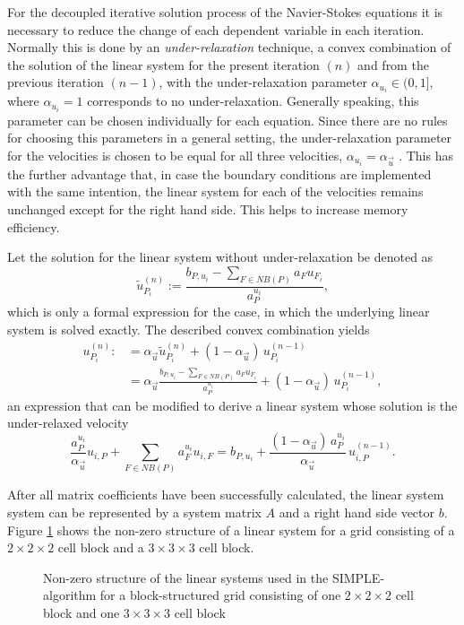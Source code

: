 For the decoupled iterative solution process of the Navier-Stokes equations it is necessary to reduce the change of each dependent variable in each iteration. Normally this is done by an \emph{under-relaxation} technique, a convex combination of the solution of the linear system for the present iteration \((n)\) and from the previous iteration \((n-1)\), with the under-relaxation parameter \(\alpha_{u_i} \in (0,1]\), where \(\alpha_{u_i} = 1\) corresponds to no under-relaxation. Generally speaking, this parameter can be chosen individually for each equation. Since there are no rules for choosing this parameters in a general setting, the under-relaxation parameter for the velocities is chosen to be equal for all three velocities, \(\alpha_{u_i} = \alpha_{\vec{u}}\) \cite{schaefer99}. This has the further advantage that, in case the boundary conditions are implemented with the same intention, the linear system for each of the velocities remains unchanged except for the right hand side. This helps to increase memory efficiency.

Let the solution for the linear system without under-relaxation be denoted as
\begin{displaymath}
  \tilde{u}_{P_i}^{(n)} := \frac{b_{P,u_i} - \sum_{F \in NB(P)} a_F u_{F_i}}{a_P^{u_i}},
\end{displaymath}
which is only a formal expression for the case, in which the underlying linear system is solved exactly. The described convex combination yields
\begin{align*}
  u_{P_i}^{(n)} :&= \alpha_{\vec{u}} \tilde{u}_{P_i}^{(n)} + (1 - \alpha_{\vec{u}} )\, u_{P_i}^{(n-1)} \\[0.5em]
                 &= \alpha_{\vec{u}} \frac{b_{P,u_i} - \sum_{F \in NB(P)} a_F u_{F_i}}{a_P^{u_i}} + (1 - \alpha_{\vec{u}} )\, u_{P_i}^{(n-1)},
\end{align*}
an expression that can be modified to derive a linear system whose solution is the under-relaxed velocity
\begin{displaymath}
  \frac{a_P^{u_i}}{\alpha_{\vec{u}}} u_{i,P} + \sum_{F \in NB(P)} a_F^{u_i} u_{i,F} 
  = 
  b_{P,u_i} + \frac{(1 - \alpha_{\vec{u}})\, a_P^{u_i}}{\alpha_{\vec{u}}}\, u_{i,P}^{(n-1)}. 
\end{displaymath}

After all matrix coefficients have been successfully calculated, the linear system system can be represented by a system matrix \(A\) and a right hand side vector \(b\). Figure \ref{fig:segassemble} shows the non-zero structure of a linear system for a grid consisting of a \(2\times2\times2\) cell block and a \(3\times3\times3\) cell block.

\begin{figure}
  \centering
  
  \caption{Non-zero structure of the linear systems used in the SIMPLE-algorithm for a block-structured grid consisting of one $2\times2\times2$ cell block and one $3\times3\times3$ cell block}
  \label{fig:segassemble}
\end{figure}
